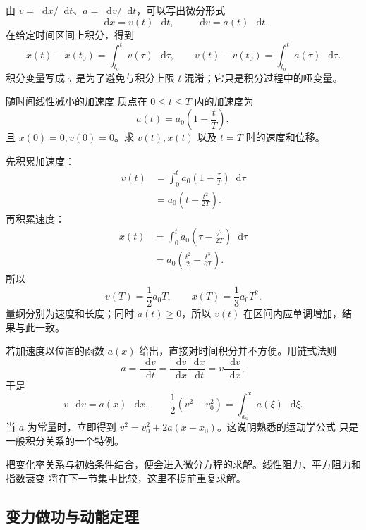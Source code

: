 \documentclass[UTF8,zihao=-4,oneside,openany]{ctexbook}
\numberwithin{equation}{section}
\newcommand{\dd}{\mathop{}\!\mathrm{d}}
\begin{document}
由 $v=\dd x/\dd t$、$a=\dd v/\dd t$，可以写出微分形式
\[
  \dd x=v(t)\,\dd t,
  \qquad
  \dd v=a(t)\,\dd t.
\]
在给定时间区间上积分，得到
\begin{equation}
  x(t)-x(t_0)=\int_{t_0}^{t}v(\tau)\,\dd\tau,
  \qquad
  v(t)-v(t_0)=\int_{t_0}^{t}a(\tau)\,\dd\tau.
  \label{eq:kinematic-integrals}
\end{equation}
积分变量写成 $\tau$ 是为了避免与积分上限 $t$ 混淆；它只是积分过程中的哑变量。

\begin{examplebox}{随时间线性减小的加速度}
质点在 $0\le t\le T$ 内的加速度为
\[
  a(t)=a_0\left(1-\frac{t}{T}\right),
\]
且 $x(0)=0,v(0)=0$。求 $v(t),x(t)$ 以及 $t=T$ 时的速度和位移。

\tcblower
先积累加速度：
\begin{align*}
  v(t)
  &=\int_0^t a_0\left(1-\frac{\tau}{T}\right)\dd\tau\\
  &=a_0\left(t-\frac{t^2}{2T}\right).
\end{align*}
再积累速度：
\begin{align*}
  x(t)
  &=\int_0^t a_0\left(\tau-\frac{\tau^2}{2T}\right)\dd\tau\\
  &=a_0\left(\frac{t^2}{2}-\frac{t^3}{6T}\right).
\end{align*}
所以
\[
  v(T)=\frac12a_0T,
  \qquad
  x(T)=\frac13a_0T^2.
\]
量纲分别为速度和长度；同时 $a(t)\ge0$，所以 $v(t)$ 在区间内应单调增加，结果与此一致。
\end{examplebox}

若加速度以位置的函数 $a(x)$ 给出，直接对时间积分并不方便。用链式法则
\begin{equation}
  a=\frac{\dd v}{\dd t}
  =\frac{\dd v}{\dd x}\frac{\dd x}{\dd t}
  =v\frac{\dd v}{\dd x},
  \label{eq:a-vdvdx}
\end{equation}
于是
\begin{equation}
  v\,\dd v=a(x)\,\dd x,
  \qquad
  \frac12(v^2-v_0^2)=\int_{x_0}^{x}a(\xi)\,\dd\xi.
  \label{eq:position-dependent-acceleration}
\end{equation}
当 $a$ 为常量时，立即得到 $v^2=v_0^2+2a(x-x_0)$。这说明熟悉的运动学公式
只是一般积分关系的一个特例。

把变化率关系与初始条件结合，便会进入微分方程的求解。线性阻力、平方阻力和指数衰变
将在下一节集中比较，这里不提前重复求解。

\subsection{变力做功与动能定理}
\end{document}
